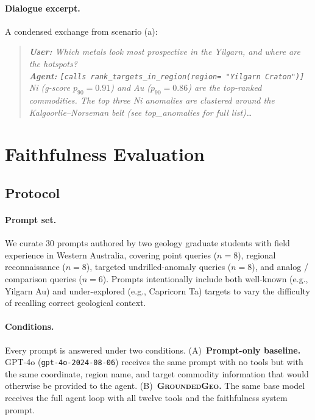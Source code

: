 \documentclass[11pt]{article}
\begin{document}
\paragraph{Dialogue excerpt.}
A condensed exchange from scenario (a):
\begin{quote}\small\itshape
\textbf{User:} Which metals look most prospective in the Yilgarn,
and where are the hotspots?\\
\textbf{Agent:} \texttt{[calls rank\_targets\_in\_region(region=
"Yilgarn Craton")]} Ni (g-score $p_{90}=0.91$) and Au
($p_{90}=0.86$) are the top-ranked commodities. The top three
Ni anomalies are clustered around the Kalgoorlie--Norseman belt
(see top\_anomalies for full list)\ldots
\end{quote}

\section{Faithfulness Evaluation}
\label{sec:eval}


\subsection{Protocol}

\paragraph{Prompt set.}
We curate 30 prompts authored by two geology graduate students with
field experience in Western Australia, covering point queries
($n=8$), regional reconnaissance ($n=8$), targeted undrilled-anomaly
queries ($n=8$), and analog / comparison queries ($n=6$). Prompts
intentionally include both well-known (e.g., Yilgarn Au) and
under-explored (e.g., Capricorn Ta) targets to vary the difficulty of
recalling correct geological context.

\paragraph{Conditions.}
Every prompt is answered under two conditions.
(A)~\textbf{Prompt-only baseline.} GPT-4o (\texttt{gpt-4o-2024-08-06})
receives the same prompt with no tools but with the same coordinate,
region name, and target commodity information that would otherwise be
provided to the agent.
(B)~\textbf{\textsc{GroundedGeo}.} The same base model receives the
full agent loop with all twelve tools and the faithfulness system
prompt.
\end{document}

